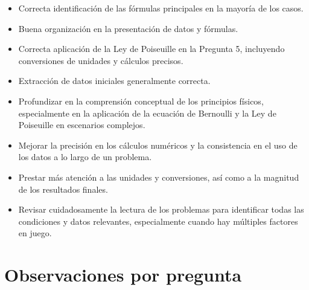 \documentclass[11pt,a4paper]{article}
\begin{document}
\vspace{4pt}
\begin{minipage}[t]{0.48\linewidth}
  \begin{tcolorbox}[cajaFortaleza, title={Fortalezas}]
\begin{itemize}[leftmargin=1.5em, itemsep=2pt]
  \item Correcta identificación de las fórmulas principales en la mayoría de los casos.
  \item Buena organización en la presentación de datos y fórmulas.
  \item Correcta aplicación de la Ley de Poiseuille en la Pregunta 5, incluyendo conversiones de unidades y cálculos precisos.
  \item Extracción de datos iniciales generalmente correcta.
\end{itemize}
  \end{tcolorbox}
\end{minipage}
\hfill
\begin{minipage}[t]{0.48\linewidth}
  \begin{tcolorbox}[cajaMejora, title={Areas de mejora}]
\begin{itemize}[leftmargin=1.5em, itemsep=2pt]
  \item Profundizar en la comprensión conceptual de los principios físicos, especialmente en la aplicación de la ecuación de Bernoulli y la Ley de Poiseuille en escenarios complejos.
  \item Mejorar la precisión en los cálculos numéricos y la consistencia en el uso de los datos a lo largo de un problema.
  \item Prestar más atención a las unidades y conversiones, así como a la magnitud de los resultados finales.
  \item Revisar cuidadosamente la lectura de los problemas para identificar todas las condiciones y datos relevantes, especialmente cuando hay múltiples factores en juego.
\end{itemize}
  \end{tcolorbox}
\end{minipage}

\section*{Observaciones por pregunta}
\end{document}
